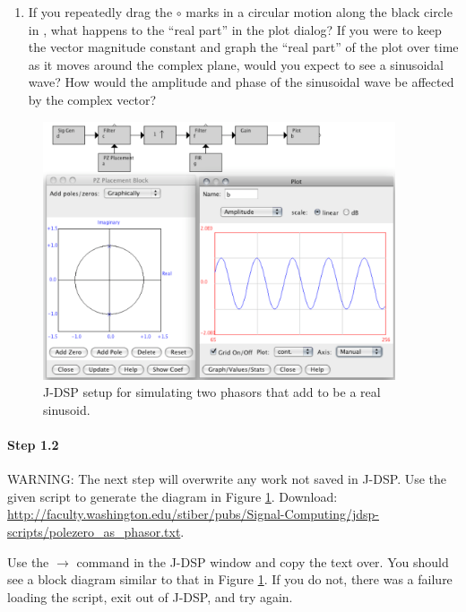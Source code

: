 \begin{enumerate}
\item If you repeatedly drag the $\circ$ marks in a circular motion along the black circle in , what happens to the ``real part'' in the plot dialog? If you were to keep the vector magnitude constant and graph the ``real part'' of the plot over time as it moves around the complex plane, would you expect to see a sinusoidal wave? How would the amplitude and phase of the sinusoidal wave be affected by the complex vector?

\end{enumerate}


\begin{figure}[t]
  \begin{center}
    \includegraphics[height=3in]{lab2/PoleZeroAsComplexExp}
  \end{center}
\caption{J-DSP setup for simulating two phasors that add to be a real sinusoid.\label{fg:PoleZeroAsComplexExp}}
\end{figure}

\paragraph{Step 1.2} 
WARNING: The next step will overwrite any work not saved in J-DSP. Use the given script to generate the diagram in Figure \ref{fg:PoleZeroAsComplexExp}. Download: \url{http://faculty.washington.edu/stiber/pubs/Signal-Computing/jdsp-scripts/polezero_as_phasor.txt}. 

Use the  $\rightarrow$ command in the J-DSP window and copy the text  over. You should see a block diagram similar to that in Figure \ref{fg:PoleZeroAsComplexExp}. If you do not, there was a failure loading the script, exit out of J-DSP, and try again. 

